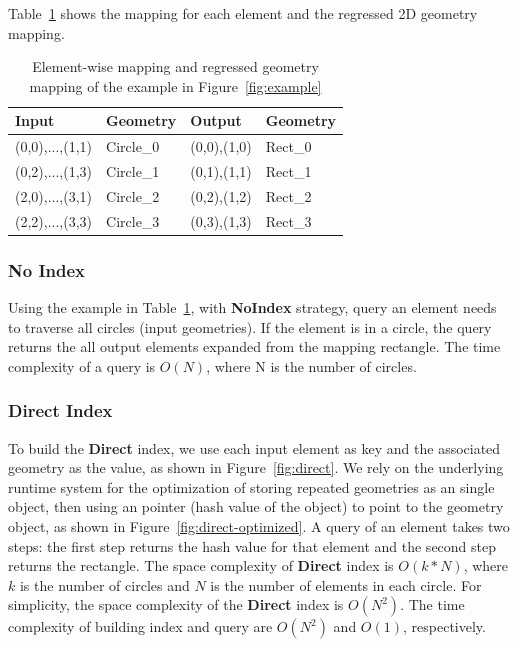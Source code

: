 \documentclass{sig-alternate}
\begin{document}
Table~\ref{tb:example} shows the mapping for each element and the regressed 2D geometry mapping.
\begin{table}[t]
\begin{center}
    \caption{Element-wise mapping and regressed geometry mapping of the example in Figure~\ref{fig:example}}
    \begin{scriptsize}
    \begin{tabular}{ | p{1.75cm} | p{1.75cm} | p{1.75cm} | p{1.75cm} |}
    \hline
    Input & Geometry & Output & Geometry \\ \hline \hline
    (0,0),...,(1,1) & Circle\_0 & (0,0),(1,0) & Rect\_0 \\ \hline
    (0,2),...,(1,3) & Circle\_1 & (0,1),(1,1) & Rect\_1 \\ \hline
    (2,0),...,(3,1) & Circle\_2 & (0,2),(1,2) & Rect\_2 \\ \hline
    (2,2),...,(3,3) & Circle\_3 & (0,3),(1,3) & Rect\_3 \\ \hline
    \end{tabular}
    \end{scriptsize}
    \label{tb:example}
\end{center}   
\end{table} 

\subsubsection{No Index}
Using the example in Table~\ref{tb:example}, with {\bf NoIndex} strategy, query an element needs to traverse all circles (input geometries).
If the element is in a circle, the query returns the all output elements expanded from the mapping rectangle.
The time complexity of a query is $O(N)$, where N is the number of circles. 

\subsubsection{Direct Index}
To build the {\bf Direct} index, we use each input element as key and the associated geometry as the value, as shown in Figure~\ref{fig:direct}.
We rely on the underlying runtime system for the optimization of storing repeated geometries as an single object,
then using an pointer (hash value of the object) to point to the geometry object, as shown in Figure~\ref{fig:direct-optimized}.
A query of an element takes two steps: the first step returns the hash value for that element and the second step returns the rectangle. 
The space complexity of {\bf Direct} index is $O(k*N)$, where $k$ is the number of circles and $N$ is the number of elements in each circle.
For simplicity, the space complexity of the {\bf Direct} index is $O(N^2)$.
The time complexity of building index and query are $O(N^2)$ and $O(1)$, respectively.
\end{document}
